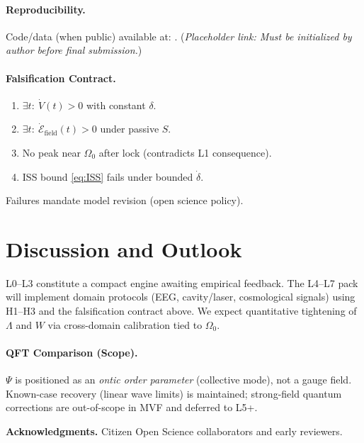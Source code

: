 \documentclass[12pt,a4paper]{article}
\begin{document}
\paragraph{Reproducibility.} Code/data (when public) available at: . (\textit{Placeholder link: Must be initialized by author before final submission.})
\paragraph{Falsification Contract.}
\begin{enumerate}[label=(F\arabic*),leftmargin=1.8em]
\item $\exists t:\ \dot V(t)>0$ with constant $\delta$.
\item $\exists t:\ \dot{\mathcal E}_{\text{field}}(t)>0$ under passive $S$.
\item No peak near $\Omega_0$ after lock (contradicts L1 consequence).
\item ISS bound \eqref{eq:ISS} fails under bounded $\dot\delta$.
\end{enumerate}
Failures mandate model revision (open science policy).

\section{Discussion and Outlook}
L0--L3 constitute a compact engine awaiting empirical feedback. The L4--L7 pack will implement domain protocols (EEG, cavity/laser, cosmological signals) using H1--H3 and the falsification contract above.
We expect quantitative tightening of \(\Lambda\) and \(W\) via cross-domain calibration tied to \(\Omega_0\).

\paragraph{QFT Comparison (Scope).}
\(\Psi\) is positioned as an \emph{ontic order parameter} (collective mode), not a gauge field. Known-case recovery (linear wave limits) is maintained; strong-field quantum corrections are out-of-scope in MVF and deferred to L5+.

\bigskip
\noindent\textbf{Acknowledgments.} Citizen Open Science collaborators and early reviewers.
\end{document}
